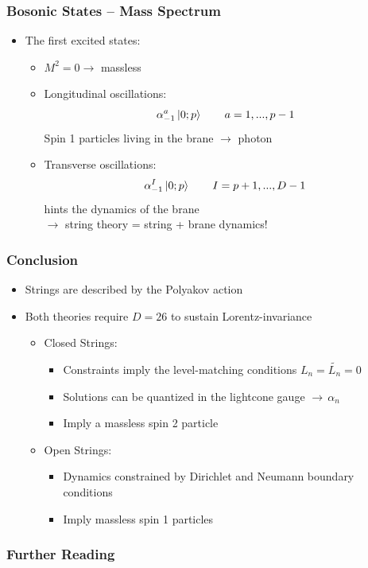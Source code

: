 \documentclass[aspectratio=169]{beamer}
\begin{document}
	\begin{frame}
		\frametitle{Bosonic States -- Mass Spectrum}
		\begin{itemize}
			\item The first excited states:
			\begin{itemize}
				\item $M^2 = 0 \rightarrow$ massless
				\item Longitudinal oscillations:
				\begin{equation*}
					\alpha^a_{-1}\ket{0;p} \qquad a = 1,...,p-1
				\end{equation*}
				Spin 1 particles living in the brane $\rightarrow$ photon
				\item Transverse oscillations:
				\begin{equation*}
					\alpha^I_{-1}\ket{0;p} \qquad I = p+1,...,D-1
				\end{equation*}
				hints the dynamics of the brane\\
				\quad $\rightarrow$ string theory = string + brane dynamics!
			\end{itemize}
		\end{itemize}
	\end{frame}

	\begin{frame}
		\frametitle{Conclusion}
		\begin{itemize}
			\item Strings are described by the Polyakov action
			\item Both theories require $D=26$ to sustain Lorentz-invariance
			\begin{itemize}
				\item Closed Strings:
				\begin{itemize}
					\item Constraints imply the level-matching conditions $L_n = \tilde{L_n} = 0$
					\item Solutions can be quantized in the lightcone gauge $\rightarrow \, \alpha_n$
					\item Imply a massless spin 2 particle
				\end{itemize}
				\item Open Strings:
				\begin{itemize}
					\item Dynamics constrained by Dirichlet and Neumann boundary conditions
					\item Imply massless spin 1 particles
				\end{itemize}
			\end{itemize}
		\end{itemize}
	\end{frame}

	\begin{frame}
		\frametitle{Further Reading}
		\printbibliography
	\end{frame}
\end{document}
